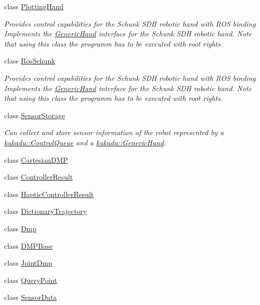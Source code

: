\begin{DoxyCompactItemize}
class \hyperlink{classkukadu_1_1PlottingHand}{Plotting\-Hand}
\begin{DoxyCompactList}\small\item\em Provides control capabilities for the Schunk S\-D\-H robotic hand with R\-O\-S binding Implements the \hyperlink{classkukadu_1_1GenericHand}{Generic\-Hand} interface for the Schunk S\-D\-H robotic hand. Note that using this class the programm has to be executed with root rights. \end{DoxyCompactList}\item 
class \hyperlink{classkukadu_1_1RosSchunk}{Ros\-Schunk}
\begin{DoxyCompactList}\small\item\em Provides control capabilities for the Schunk S\-D\-H robotic hand with R\-O\-S binding Implements the \hyperlink{classkukadu_1_1GenericHand}{Generic\-Hand} interface for the Schunk S\-D\-H robotic hand. Note that using this class the programm has to be executed with root rights. \end{DoxyCompactList}\item 
class \hyperlink{classkukadu_1_1SensorStorage}{Sensor\-Storage}
\begin{DoxyCompactList}\small\item\em Can collect and store sensor information of the robot represented by a \hyperlink{classkukadu_1_1ControlQueue}{kukadu\-::\-Control\-Queue} and a \hyperlink{classkukadu_1_1GenericHand}{kukadu\-::\-Generic\-Hand}. \end{DoxyCompactList}\item 
class \hyperlink{classkukadu_1_1CartesianDMP}{Cartesian\-D\-M\-P}
\item 
class \hyperlink{classkukadu_1_1ControllerResult}{Controller\-Result}
\item 
class \hyperlink{classkukadu_1_1HapticControllerResult}{Haptic\-Controller\-Result}
\item 
class \hyperlink{classkukadu_1_1DictionaryTrajectory}{Dictionary\-Trajectory}
\item 
class \hyperlink{classkukadu_1_1Dmp}{Dmp}
\item 
class \hyperlink{classkukadu_1_1DMPBase}{D\-M\-P\-Base}
\item 
class \hyperlink{classkukadu_1_1JointDmp}{Joint\-Dmp}
\item 
class \hyperlink{classkukadu_1_1QueryPoint}{Query\-Point}
\item 
class \hyperlink{classkukadu_1_1SensorData}{Sensor\-Data}
\item 

\end{DoxyCompactItemize}
